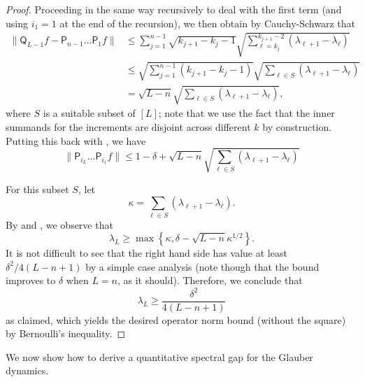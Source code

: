 \documentclass[11pt]{article}
\begin{document}
\begin{proof}
Proceeding in the same way recursively to deal with the first term (and using $i_1=1$ at the end of the recursion), we then obtain by Cauchy-Schwarz that
\begin{align*}
    \|\mathsf{Q}_{{L-1}}f-\mathsf{P}_{n-1}\ldots \mathsf{P}_1f\|&\leq \sum_{j=1}^{n-1} \sqrt{k_{j+1}-k_{j}-1}\sqrt{\sum_{\ell=k_{j}}^{k_{j+1}-2} (\lambda_{\ell+1}-\lambda_{\ell})} \nonumber\\
    &\leq \sqrt{\sum_{j=1}^{n-1} (k_{j+1}-k_j-1)}\sqrt{\sum_{\ell\in S}(\lambda_{\ell+1}-\lambda_{\ell})}\nonumber\\
    &=\sqrt{L-n}\sqrt{\sum_{\ell\in S}(\lambda_{\ell+1}-\lambda_{\ell})},
\end{align*}
where $S$ is a suitable subset of $[L]$; note that we use the fact that the inner summands for the increments are disjoint across different $k$ by construction. Putting this back with , we have
\begin{equation}
\label{eq:bound_2}
    \|\mathsf{P}_{i_{L}}\ldots \mathsf{P}_{i_1}f\|\leq 1-\delta+ \sqrt{L-n}\sqrt{\sum_{\ell\in S}(\lambda_{\ell+1}-\lambda_{\ell})}
\end{equation}

For this subset $S$, let 
\begin{equation*}
    \kappa = \sum_{\ell\in S}(\lambda_{\ell+1}-\lambda_{\ell}).
\end{equation*}
By  and , we observe that
\begin{equation*}
    \lambda_L \geq \max\left\{\kappa,\delta- \sqrt{L-n}\kappa^{1/2} \right\}.
\end{equation*}
It is not difficult to see that the right hand side  has value at least $\delta^2/4(L-n+1)$ by a simple case analysis (note  though that the bound improves to $\delta$ when $L=n$, as it should). Therefore, we conclude that 
\begin{equation*}
    \lambda_L\geq \frac{\delta^2}{4(L-n+1)}
\end{equation*}
as claimed, which yields the desired operator norm bound (without the square) by Bernoulli's inequality.
\end{proof}

We now show how to derive a quantitative spectral gap for the Glauber dynamics.
\end{document}
